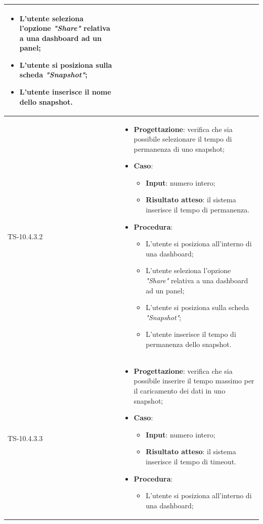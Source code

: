 \begin{longtable}{|C{2.5cm}|C{13cm}|}
\begin{itemize}
\begin{itemize}
		\item L'utente seleziona l'opzione \emph{"Share"} relativa a una dashboard ad un panel;
		\item L'utente si posiziona sulla scheda \emph{"Snapshot"};
		\item L'utente inserisce il nome dello snapshot.
	\end{itemize} 
\end{itemize}
	  \\
	\hline
	{TS-10.4.3.2} &
\begin{itemize}
	\item \textbf{Progettazione}: verifica che sia possibile selezionare il
	tempo di permanenza di uno snapshot;
	\item \textbf{Caso}: 
	\begin{itemize}
		\item \textbf{Input}: numero intero;
		\item \textbf{Risultato atteso}: il sistema inserisce il tempo di permanenza.
	\end{itemize}
	\item \textbf{Procedura}:
	\begin{itemize}
		\item L'utente si posiziona all'interno di una dashboard;
		\item L'utente seleziona l'opzione \emph{"Share"} relativa a una dashboard ad un panel;
		\item L'utente si posiziona sulla scheda \emph{"Snapshot"};
		\item L'utente inserisce il tempo di permanenza dello snapshot.
	\end{itemize} 
\end{itemize}
	  \\
	\hline
	{TS-10.4.3.3} & 
\begin{itemize}
	\item \textbf{Progettazione}: verifica che sia possibile inserire il tempo
	massimo per il caricamento dei dati in uno snapshot;
	\item \textbf{Caso}: 
	\begin{itemize}
		\item \textbf{Input}: numero intero;
		\item \textbf{Risultato atteso}: il sistema inserisce il tempo di timeout.
	\end{itemize}
	\item \textbf{Procedura}:
	\begin{itemize}
		\item L'utente si posiziona all'interno di una dashboard;

\end{itemize}
\end{itemize}
\end{longtable}
